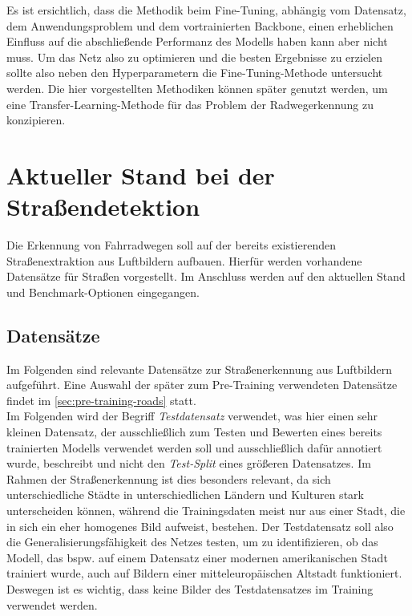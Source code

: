 Es ist ersichtlich, dass die Methodik beim Fine-Tuning, abhängig vom Datensatz, dem Anwendungsproblem und dem vortrainierten Backbone, einen erheblichen Einfluss 
auf die abschließende Performanz des Modells haben kann aber nicht muss. 
Um das Netz also zu optimieren und die besten Ergebnisse zu erzielen sollte also neben den Hyperparametern die Fine-Tuning-Methode untersucht werden. 
Die hier vorgestellten Methodiken können später genutzt werden, 
um eine Transfer-Learning-Methode für das Problem der Radwegerkennung zu konzipieren. 


\section{Aktueller Stand bei der Straßendetektion}

Die Erkennung von Fahrradwegen soll auf der bereits existierenden Straßenextraktion aus Luftbildern aufbauen.
Hierfür werden vorhandene Datensätze für Straßen vorgestellt. 
Im Anschluss werden auf den aktuellen Stand und Benchmark-Optionen eingegangen.

\subsection{Datensätze} \label{sec:road-detection:roads-data}

Im Folgenden sind relevante Datensätze zur Straßenerkennung aus Luftbildern aufgeführt. 
Eine Auswahl der später zum Pre-Training verwendeten Datensätze findet im \autoref{sec:pre-training-roads} statt.\\
Im Folgenden wird der Begriff \textit{Testdatensatz} verwendet, was hier einen sehr kleinen Datensatz, 
der ausschließlich zum Testen und Bewerten eines bereits 
trainierten Modells verwendet werden soll und ausschließlich dafür annotiert wurde, beschreibt 
und nicht den \textit{Test-Split} eines größeren Datensatzes. 
Im Rahmen der Straßenerkennung ist dies besonders relevant, 
da sich unterschiedliche Städte in unterschiedlichen Ländern und Kulturen stark unterscheiden können, 
während die Trainingsdaten meist nur aus einer Stadt, die in sich ein eher homogenes Bild aufweist, bestehen.
Der Testdatensatz soll also die Generalisierungsfähigkeit des Netzes testen, um zu identifizieren,
ob das Modell, das bspw. auf einem Datensatz einer modernen amerikanischen Stadt trainiert wurde, 
auch auf Bildern einer mitteleuropäischen Altstadt funktioniert. Deswegen ist es wichtig, 
dass keine Bilder des Testdatensatzes im Training verwendet werden. 

